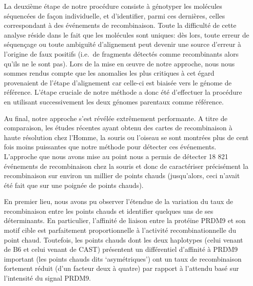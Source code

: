 {La deuxième étape de notre procédure consiste à génotyper les molécules séquencées de façon individuelle, et d'identifier, parmi ces dernières, celles correspondant à des événements de recombinaison.
Toute la difficulté de cette analyse réside dans le fait que les molécules sont uniques: dès lors, toute erreur de séquençage ou toute ambiguïté d'alignement peut devenir une source d'erreur à l'origine de faux positifs (i.e.\ de fragments détectés comme recombinants alors qu'ils ne le sont pas).
Lors de la mise en œuvre de notre approche, nous nous sommes rendus compte que les anomalies les plus critiques à cet égard provenaient de l'étape d'alignement car celle-ci est biaisée vers le génome de référence.
L'étape cruciale de notre méthode a donc été d'effectuer la procédure en utilisant successivement les deux génomes parentaux comme référence.

Au final, notre approche s'est révélée extrêmement performante.
A titre de comparaison, les études récentes ayant obtenu des cartes de recombinaison à haute résolution chez l'Homme, la souris ou l'oiseau \citep{halldorsson2016rate,smeds2016highresolution,li2018highresolution} se sont montrées plus de cent fois moins puissantes que notre méthode pour détecter ces événements.\\


L'approche que nous avons mise au point nous a permis de détecter 18 821 événements de recombinaison chez la souris et donc de caractériser précisément la recombinaison sur environ un millier de points chauds (jusqu'alors, ceci n'avait été fait que sur une poignée de points chauds).

En premier lieu, nous avons pu observer l'étendue de la variation du taux de recombinaison entre les points chauds et identifier quelques uns de ses déterminants.
En particulier, l'affinité de liaison entre la protéine PRDM9 et son motif cible est parfaitement proportionnelle à l'activité recombinationnelle du point chaud.
Toutefois, les points chauds dont les deux haplotypes (celui venant de B6 et celui venant de CAST) présentent un différentiel d'affinité à PRDM9 important (les points chauds dits ‘asymétriques’) ont un taux de recombinaison fortement réduit (d'un facteur deux à quatre) par rapport à l'attendu basé sur l'intensité du signal PRDM9.

}
